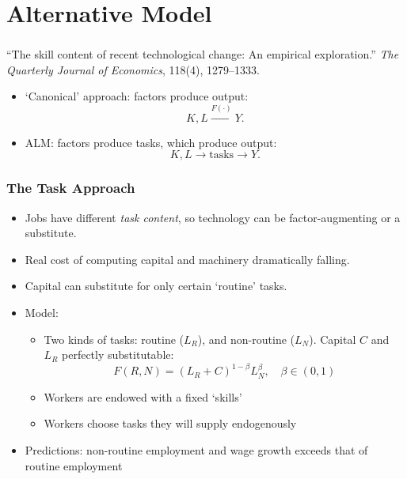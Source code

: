 \documentclass[red]{beamer}
\begin{document}
\section{Alternative Model}
\begin{frame}[fragile] %
\frametitle{\cite{Levy2003}}
``The skill content of recent technological change: An empirical exploration.'' \emph{The Quarterly Journal of Economics}, 118(4), 1279--1333.
\vspace{1cm}

\begin{itemize}
\item `Canonical' approach: factors produce output:
\[ K,L \overset{F(\cdot)}{\longrightarrow} Y. \]
\item ALM: factors produce tasks, which produce output:
\[ K, L \longrightarrow \text{tasks} \longrightarrow Y. \]
\end{itemize}
\end{frame}

\begin{frame}
\frametitle{The Task Approach}
\begin{itemize}
\item Jobs have different \emph{task content}, so technology can be factor-augmenting or a substitute.
\item Real cost of computing capital and machinery dramatically falling.
\item Capital can substitute for only certain `routine' tasks.
\item Model:
  \begin{itemize}
  \item Two kinds of tasks: routine ($L_R$), and non-routine ($L_N$). Capital $C$ and $L_R$ perfectly substitutable:
    $$ F(R,N) = (L_R + C)^{1-\beta}L_N^{\beta},\quad\beta\in(0,1)$$
  \item Workers are endowed with a fixed `skills'
  \item Workers choose tasks they will supply endogenously
  \end{itemize}
\item Predictions: non-routine employment and wage growth exceeds that of routine employment
\end{itemize}
\end{frame}
\end{document}
